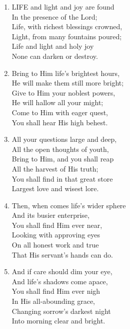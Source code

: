 \documentclass[11pt,a4paper]{article}
\begin{document}
\begin{enumerate}
    \item LIFE and light and joy are found \\
        In the presence of the Lord; \\
        Life, with richest blessings crowned, \\
        Light, from many fountains poured; \\
        Life and light and holy joy \\
        None can darken or destroy.

    \item Bring to Him life's brightest hours, \\
        He will make them still more bright; \\
        Give to Him your noblest powers, \\
        He will hallow all your might; \\
        Come to Him with eager quest, \\
        You shall hear His high behest.

    \item All your questions large and deep, \\
        All the open thoughts of youth, \\
        Bring to Him, and you shall reap \\
        All the harvest of His truth; \\
        You shall find in that great store \\
        Largest love and wisest lore.

    \item Then, when comes life's wider sphere \\
        And its busier enterprise, \\
        You shall find Him ever near, \\
        Looking with approving eyes \\
        On all honest work and true \\
        That His servant's hands can do.

    \item And if care should dim your eye, \\
        And life's shadows come apace, \\
        You shall find Him ever nigh \\
        In His all-abounding grace, \\
        Changing sorrow's darkest night \\
        Into morning clear and bright.

\end{enumerate}
\end{document}
